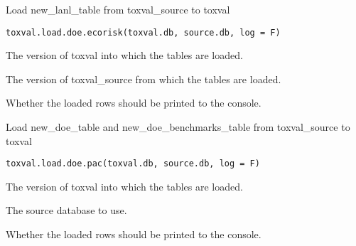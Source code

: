 \documentclass[letterpaper]{book}
\begin{document}
%
\begin{Description}\relax
Load new\_lanl\_table from toxval\_source to toxval
\end{Description}
%
\begin{Usage}
\begin{verbatim}
toxval.load.doe.ecorisk(toxval.db, source.db, log = F)
\end{verbatim}
\end{Usage}
%
\begin{Arguments}
\begin{ldescription}
\item[\code{toxval.db}] The version of toxval into which the tables are loaded.

\item[\code{source.db}] The version of toxval\_source from which the tables are loaded.

\item[\code{verbose}] Whether the loaded rows should be printed to the console.
\end{ldescription}
\end{Arguments}
%
\begin{Description}\relax
Load new\_doe\_table and new\_doe\_benchmarks\_table from toxval\_source to toxval
\end{Description}
%
\begin{Usage}
\begin{verbatim}
toxval.load.doe.pac(toxval.db, source.db, log = F)
\end{verbatim}
\end{Usage}
%
\begin{Arguments}
\begin{ldescription}
\item[\code{toxval.db}] The version of toxval into which the tables are loaded.

\item[\code{source.db}] The source database to use.

\item[\code{verbose}] Whether the loaded rows should be printed to the console.
\end{ldescription}
\end{Arguments}
\end{document}
